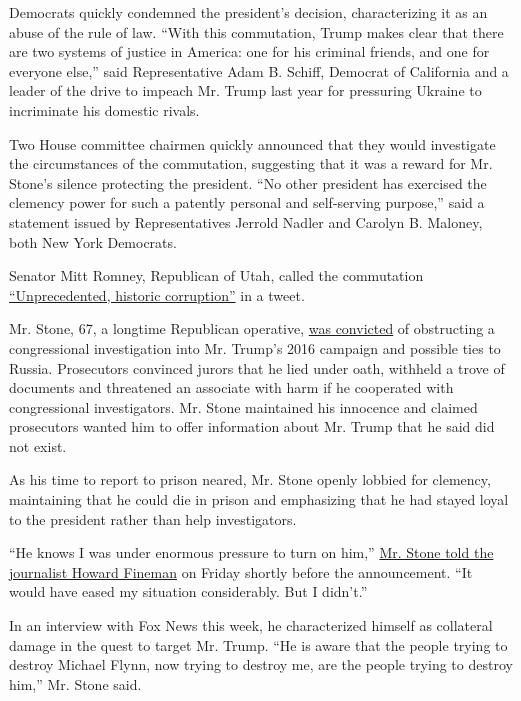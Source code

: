 Democrats quickly condemned the president's decision, characterizing it
as an abuse of the rule of law. ``With this commutation, Trump makes
clear that there are two systems of justice in America: one for his
criminal friends, and one for everyone else,'' said Representative Adam
B. Schiff, Democrat of California and a leader of the drive to impeach
Mr. Trump last year for pressuring Ukraine to incriminate his domestic
rivals.

Two House committee chairmen quickly announced that they would
investigate the circumstances of the commutation, suggesting that it was
a reward for Mr. Stone's silence protecting the president. ``No other
president has exercised the clemency power for such a patently personal
and self-serving purpose,'' said a statement issued by Representatives
Jerrold Nadler and Carolyn B. Maloney, both New York Democrats.

Senator Mitt Romney, Republican of Utah, called the commutation
\href{https://twitter.com/MittRomney/status/1281937795616067586}{``Unprecedented,
historic corruption''} in a tweet.

Mr. Stone, 67, a longtime Republican operative,
\href{https://www.nytimes.com/2019/11/15/us/politics/roger-stone-trial-guilty.html}{was
convicted} of obstructing a congressional investigation into Mr. Trump's
2016 campaign and possible ties to Russia. Prosecutors convinced jurors
that he lied under oath, withheld a trove of documents and threatened an
associate with harm if he cooperated with congressional investigators.
Mr. Stone maintained his innocence and claimed prosecutors wanted him to
offer information about Mr. Trump that he said did not exist.

As his time to report to prison neared, Mr. Stone openly lobbied for
clemency, maintaining that he could die in prison and emphasizing that
he had stayed loyal to the president rather than help investigators.

``He knows I was under enormous pressure to turn on him,''
\href{https://twitter.com/howardfineman/status/1281681337351626752}{Mr.
Stone told the journalist Howard Fineman} on Friday shortly before the
announcement. ``It would have eased my situation considerably. But I
didn't.''

In an interview with Fox News this week, he characterized himself as
collateral damage in the quest to target Mr. Trump. ``He is aware that
the people trying to destroy Michael Flynn, now trying to destroy me,
are the people trying to destroy him,'' Mr. Stone said.

